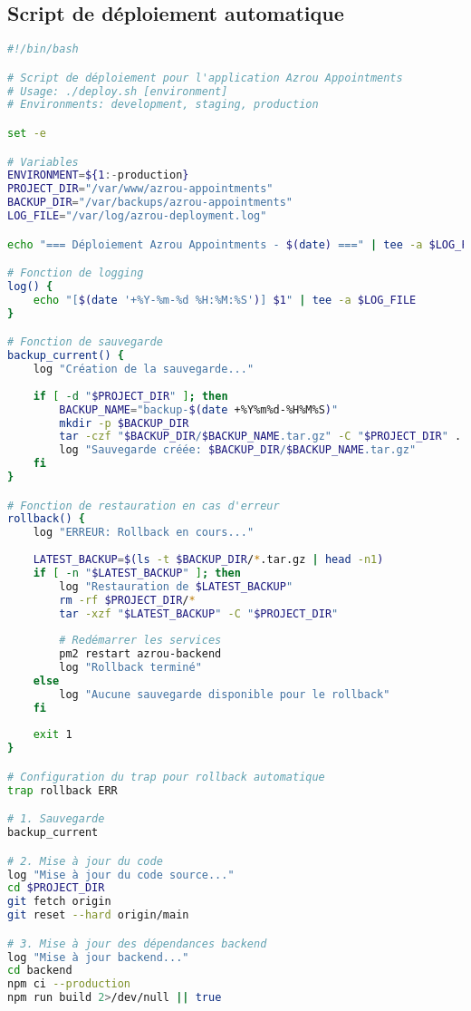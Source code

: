 \subsection{Script de déploiement automatique}

\begin{lstlisting}[language=bash, caption=deploy.sh - Script de déploiement complet]
#!/bin/bash

# Script de déploiement pour l'application Azrou Appointments
# Usage: ./deploy.sh [environment]
# Environments: development, staging, production

set -e

# Variables
ENVIRONMENT=${1:-production}
PROJECT_DIR="/var/www/azrou-appointments"
BACKUP_DIR="/var/backups/azrou-appointments"
LOG_FILE="/var/log/azrou-deployment.log"

echo "=== Déploiement Azrou Appointments - $(date) ===" | tee -a $LOG_FILE

# Fonction de logging
log() {
    echo "[$(date '+%Y-%m-%d %H:%M:%S')] $1" | tee -a $LOG_FILE
}

# Fonction de sauvegarde
backup_current() {
    log "Création de la sauvegarde..."
    
    if [ -d "$PROJECT_DIR" ]; then
        BACKUP_NAME="backup-$(date +%Y%m%d-%H%M%S)"
        mkdir -p $BACKUP_DIR
        tar -czf "$BACKUP_DIR/$BACKUP_NAME.tar.gz" -C "$PROJECT_DIR" .
        log "Sauvegarde créée: $BACKUP_DIR/$BACKUP_NAME.tar.gz"
    fi
}

# Fonction de restauration en cas d'erreur
rollback() {
    log "ERREUR: Rollback en cours..."
    
    LATEST_BACKUP=$(ls -t $BACKUP_DIR/*.tar.gz | head -n1)
    if [ -n "$LATEST_BACKUP" ]; then
        log "Restauration de $LATEST_BACKUP"
        rm -rf $PROJECT_DIR/*
        tar -xzf "$LATEST_BACKUP" -C "$PROJECT_DIR"
        
        # Redémarrer les services
        pm2 restart azrou-backend
        log "Rollback terminé"
    else
        log "Aucune sauvegarde disponible pour le rollback"
    fi
    
    exit 1
}

# Configuration du trap pour rollback automatique
trap rollback ERR

# 1. Sauvegarde
backup_current

# 2. Mise à jour du code
log "Mise à jour du code source..."
cd $PROJECT_DIR
git fetch origin
git reset --hard origin/main

# 3. Mise à jour des dépendances backend
log "Mise à jour backend..."
cd backend
npm ci --production
npm run build 2>/dev/null || true


\end{lstlisting}
